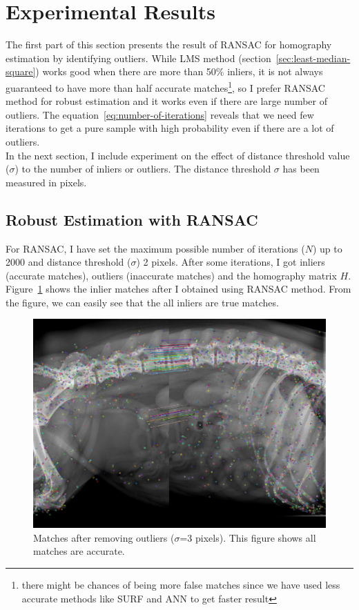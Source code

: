 \section{Experimental Results}
The first part of this section presents the result of RANSAC for homography estimation by identifying outliers. While LMS method (section~\ref{sec:least-median-square}) works good when there are more than 50\% inliers, it is not always guaranteed to have more than half accurate matches\footnote{there might be chances of being more false matches since we have used less accurate methods like SURF and ANN to get faster result}, so I prefer RANSAC method for robust estimation and it works even if there are large number of outliers. The equation~\ref{eq:number-of-iterations} reveals that we need few iterations to get a pure sample with high probability even if there are a lot of outliers.\\

\noindent In the next section, I include experiment on the effect of distance threshold value ($\sigma$) to the number of inliers or outliers.  The distance threshold $\sigma$ has been measured in pixels. 

\subsection{Robust Estimation with RANSAC}
For RANSAC, I have set the maximum possible number of iterations ($N$) up to 2000 and distance threshold ($\sigma$) 2 pixels. After some iterations, I got inliers (accurate matches), outliers (inaccurate matches) and the homography matrix $H$. Figure~\ref{fig:RANSAC-result} shows the inlier matches after I obtained using RANSAC method. From the figure, we can easily see that the all inliers are true matches.

\begin{figure}[H]%
\includegraphics[scale=0.25]{2.mainmatter/2.Methodology/figures/inliers}
\caption[Matches After Removing Outliers]{Matches after removing outliers ($\sigma$=3 pixels). This figure shows all matches are accurate.}%
\label{fig:RANSAC-result}%
\end{figure}

